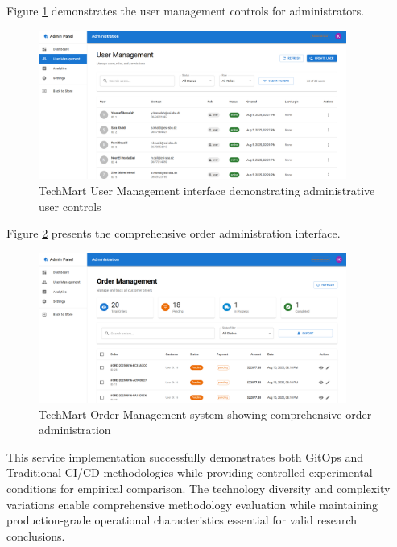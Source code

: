 Figure \ref{fig:techmart-user-management} demonstrates the user management controls for administrators.

\begin{figure}[H]
\centering
\includegraphics[width=0.9\textwidth]{figures/chapter5/techmart-user-management.png}
\caption{TechMart User Management interface demonstrating administrative user controls}
\label{fig:techmart-user-management}
\end{figure}

Figure \ref{fig:techmart-order-management} presents the comprehensive order administration interface.

\begin{figure}[H]
\centering
\includegraphics[width=0.9\textwidth]{figures/chapter5/techmart-order-management.png}
\caption{TechMart Order Management system showing comprehensive order administration}
\label{fig:techmart-order-management}
\end{figure}


This service implementation successfully demonstrates both GitOps and Traditional CI/CD methodologies while providing controlled experimental conditions for empirical comparison. The technology diversity and complexity variations enable comprehensive methodology evaluation while maintaining production-grade operational characteristics essential for valid research conclusions.

